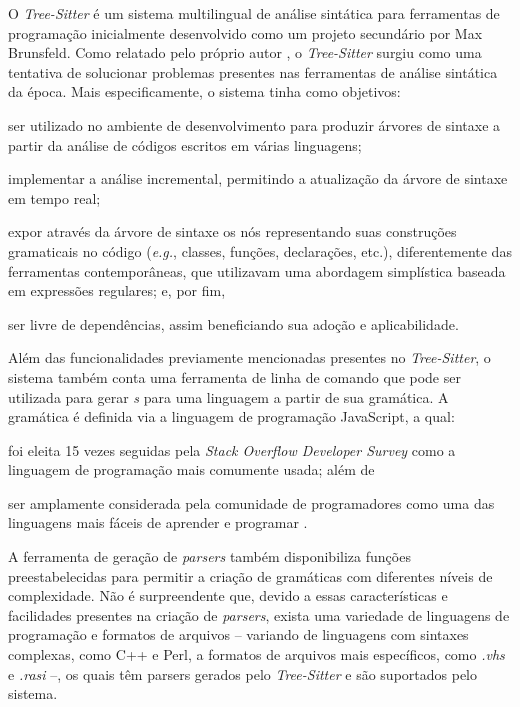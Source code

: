 \documentclass
  [11pt, a4paper, english, openright, sumario = tradicional, twoside, brazil]
  {abntex2}
\begin{document}
  O \textit{Tree-Sitter} é um sistema multilingual de análise sintática para
  ferramentas de programação inicialmente desenvolvido como um projeto
  secundário por Max Brunsfeld. Como relatado pelo próprio autor
  \cite{github-2017-tree}, o \textit{Tree-Sitter} surgiu como uma tentativa de
  solucionar problemas presentes nas ferramentas de análise sintática da época.
  Mais especificamente, o sistema tinha como objetivos:
  \begin{inparaenum}
    \item ser utilizado no ambiente de desenvolvimento para produzir árvores de
          sintaxe a partir da análise de códigos escritos em várias linguagens;
    \item implementar a análise incremental, permitindo a atualização da árvore
          de sintaxe em tempo real;
    \item expor através da árvore de sintaxe os nós representando suas
          construções gramaticais no código (\textit{e.g.}, classes, funções,
          declarações, etc.), diferentemente das ferramentas contemporâneas,
          que utilizavam uma abordagem simplística baseada em expressões
          regulares; e, por fim,
    \item ser livre de dependências, assim beneficiando sua adoção e
          aplicabilidade.
  \end{inparaenum}

  Além das funcionalidades previamente mencionadas presentes no
  \textit{Tree-Sitter}, o sistema também conta uma ferramenta de linha de
  comando que pode ser utilizada para gerar \textit{s} para uma
  linguagem a partir de sua gramática. A gramática é definida via a linguagem
  de programação JavaScript, a qual:
  \begin{inparaenum}
    \item foi eleita 15 vezes seguidas pela
          \textit{Stack Overflow Developer Survey}
          \cite{stack-overflow-2022-stack} como a linguagem de programação mais
          comumente usada; além de
    \item ser amplamente considerada pela comunidade de programadores
          como uma das linguagens mais fáceis de aprender e programar
          \cites {berkeley-2023-11}{goel-2023-how}{w3schools-2023-javascript}.
  \end{inparaenum}
  A ferramenta de geração de \textit{parsers} também disponibiliza funções
  preestabelecidas para permitir a criação de gramáticas com diferentes níveis
  de complexidade. Não é surpreendente que, devido a essas características e
  facilidades presentes na criação de \textit{parsers}, exista uma variedade de
  linguagens de programação e formatos de arquivos -- variando de linguagens
  com sintaxes complexas, como C++ e Perl, a formatos de arquivos mais
  específicos, como \textit{.vhs} e \textit{.rasi} --, os quais têm parsers
  gerados pelo \textit{Tree-Sitter} e são suportados pelo sistema.
\end{document}

